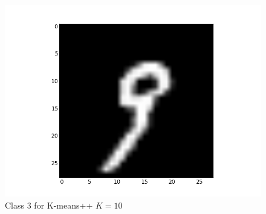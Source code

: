 \documentclass[submit]{harvardml}
\begin{document}
\begin{figure}[ht]
    \includegraphics[scale=0.20]{K10-representative-2-2}
    \caption{Class 3 for K-means++ $K=10$}
\end{figure}
\end{document}
